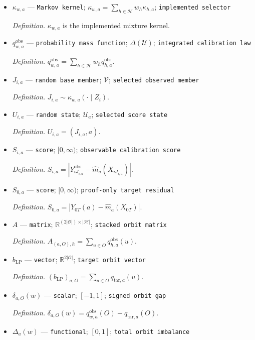 \documentclass{article}
\begin{document}
\begin{itemize}
  \item \(\kappa_{w,a}\) --- \texttt{Markov kernel}; \(\kappa_{w,a}=\sum_{h\in\mathcal H}w_h\kappa_{h,a}\); \texttt{implemented selector}
  \par\smallskip\noindent\emph{Definition.} \(\kappa_{w,a}\) is the implemented mixture kernel.
  \item \(q^{\mathrm{obs}}_{w,a}\) --- \texttt{probability mass function}; \(\Delta(\mathcal U)\); \texttt{integrated calibration law}
  \par\smallskip\noindent\emph{Definition.} \(q^{\mathrm{obs}}_{w,a}=\sum_{h\in\mathcal H}w_hq^{\mathrm{obs}}_{h,a}\).
  \item \(J_{i,a}\) --- \texttt{random base member}; \(\mathcal V\); \texttt{selected observed member}
  \par\smallskip\noindent\emph{Definition.} \(J_{i,a}\sim\kappa_{w,a}(\cdot\mid Z_i)\).
  \item \(U_{i,a}\) --- \texttt{random state}; \(\mathcal U_a\); \texttt{selected score state}
  \par\smallskip\noindent\emph{Definition.} \(U_{i,a}=(J_{i,a},a)\).
  \item \(S_{i,a}\) --- \texttt{score}; \([0,\infty)\); \texttt{observable calibration score}
  \par\smallskip\noindent\emph{Definition.} \(S_{i,a}=|Y^{\mathrm{obs}}_{iJ_{i,a}}-\widehat m_a(X_{iJ_{i,a}})|\).
  \item \(S_{0,a}\) --- \texttt{score}; \([0,\infty)\); \texttt{proof-\allowbreak{}only target residual}
  \par\smallskip\noindent\emph{Definition.} \(S_{0,a}=|Y_{0T}(a)-\widehat m_a(X_{0T})|\).
  \item \(A\) --- \texttt{matrix}; \(\mathbb R^{(2|\mathcal O|)\times|\mathcal H|}\); \texttt{stacked orbit matrix}
  \par\smallskip\noindent\emph{Definition.} \(A_{(a,O),h}=\sum_{u\in O}q^{\mathrm{obs}}_{h,a}(u)\).
  \item \(b_{\mathrm{LP}}\) --- \texttt{vector}; \(\mathbb R^{2|\mathcal O|}\); \texttt{target orbit vector}
  \par\smallskip\noindent\emph{Definition.} \((b_{\mathrm{LP}})_{a,O}=\sum_{u\in O}q_{\mathrm{tar},a}(u)\).
  \item \(\delta_{a,O}(w)\) --- \texttt{scalar}; \([-1,1]\); \texttt{signed orbit gap}
  \par\smallskip\noindent\emph{Definition.} \(\delta_{a,O}(w)=q^{\mathrm{obs}}_{w,a}(O)-q_{\mathrm{tar},a}(O)\).
  \item \(\Delta_a(w)\) --- \texttt{functional}; \([0,1]\); \texttt{total orbit imbalance}

\end{itemize}
\end{document}
